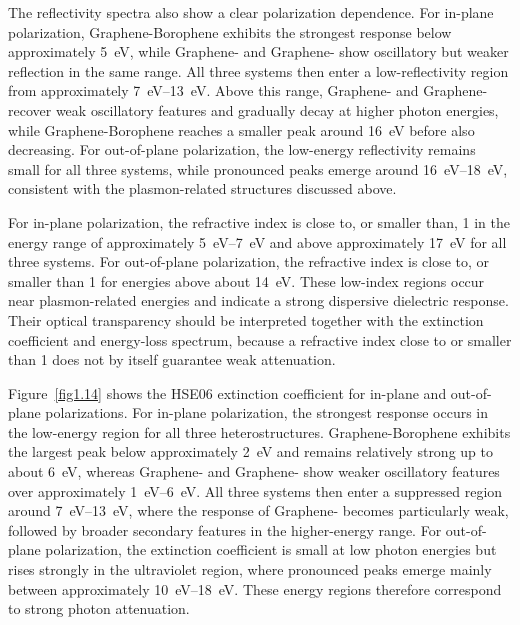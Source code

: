 The reflectivity spectra also show a clear polarization dependence.
For in-plane polarization, Graphene-Borophene exhibits the strongest response below approximately \qty{5}{\electronvolt}, while Graphene- and Graphene- show oscillatory but weaker reflection in the same range.
All three systems then enter a low-reflectivity region from approximately \qtyrange{7}{13}{\electronvolt}.
Above this range, Graphene- and Graphene- recover weak oscillatory features and gradually decay at higher photon energies, while Graphene-Borophene reaches a smaller peak around \qty{16}{\electronvolt} before also decreasing.
For out-of-plane polarization, the low-energy reflectivity remains small for all three systems, while pronounced peaks emerge around \qtyrange{16}{18}{\electronvolt}, consistent with the plasmon-related structures discussed above.

For in-plane polarization,
the refractive index is close to, or smaller than, 1 in the energy range of approximately \qtyrange{5}{7}{\electronvolt}
and above approximately \qty{17}{\electronvolt} for all three systems.
For out-of-plane polarization,
the refractive index is close to, or smaller than 1 for energies above about \qty{14}{\electronvolt}.
These low-index regions occur near plasmon-related energies and indicate a strong dispersive dielectric response.
Their optical transparency should be interpreted together with the extinction coefficient and energy-loss spectrum, because a refractive index close to or smaller than 1 does not by itself guarantee weak attenuation.

Figure~\ref{fig1.14} shows the HSE06 extinction coefficient for in-plane and out-of-plane polarizations.
For in-plane polarization, the strongest response occurs in the low-energy region for all three heterostructures.
Graphene-Borophene exhibits the largest peak below approximately \qty{2}{\electronvolt} and remains relatively strong up to about \qty{6}{\electronvolt}, whereas Graphene- and Graphene- show weaker oscillatory features over approximately \qtyrange{1}{6}{\electronvolt}.
All three systems then enter a suppressed region around \qtyrange{7}{13}{\electronvolt}, where the response of Graphene- becomes particularly weak,
followed by broader secondary features in the higher-energy range.
For out-of-plane polarization, the extinction coefficient is small at low photon energies but rises strongly in the ultraviolet region, where pronounced peaks emerge mainly between approximately \qtyrange{10}{18}{\electronvolt}.
These energy regions therefore correspond to strong photon attenuation.

